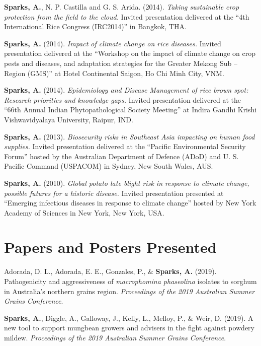 \documentclass[11pt, a4paper]{awesome-cv}
\begin{document}
\textbf{Sparks, A.}, N. P. Castilla and G. S. Arida. (2014).
\emph{Taking sustainable crop protection from the field to the cloud.}
Invited presentation delivered at the ``4th International Rice Congress
(IRC2014)'' in Bangkok, THA.

\textbf{Sparks, A.} (2014). \emph{Impact of climate change on rice
diseases.} Invited presentation delivered at the ``Workshop on the
impact of climate change on crop pests and diseases, and adaptation
strategies for the Greater Mekong Sub -- Region (GMS)'' at Hotel
Continental Saigon, Ho Chi Minh City, VNM.

\textbf{Sparks, A.} (2014). \emph{Epidemiology and Disease Management of
rice brown spot: Research priorities and knowledge gaps.} Invited
presentation delivered at the ``66th Annual Indian Phytopathological
Society Meeting'' at Indira Gandhi Krishi Vishwavidyalaya University,
Raipur, IND.

\textbf{Sparks, A.} (2013). \emph{Biosecurity risks in Southeast Asia
impacting on human food supplies.} Invited presentation delivered at the
``Pacific Environmental Security Forum'' hosted by the Australian
Department of Defence (ADoD) and U. S. Pacific Command (USPACOM) in
Sydney, New South Wales, AUS.

\textbf{Sparks, A.} (2010). \emph{Global potato late blight risk in
response to climate change, possible futures for a historic disease.}
Invited presentation presented at ``Emerging infectious diseases in
response to climate change'' hosted by New York Academy of Sciences in
New York, New York, USA.

\endgroup

\hypertarget{papers-and-posters-presented}{%
\section{Papers and Posters
Presented}\label{papers-and-posters-presented}}

\begingroup
\setlength{\parindent}{-0.5in}
\setlength{\leftskip}{0.5in}

\hypertarget{refs_proceedings}{}
\leavevmode{}%
Adorada, D. L., Adorada, E. E., Gonzales, P., \& \textbf{Sparks, A.}
(2019). Pathogenicity and aggressiveness of \emph{macrophomina
phaseolina} isolates to sorghum in {Australia's} northern grains region.
\emph{Proceedings of the 2019 Australian Summer Grains Conference}.

\leavevmode{}%
\textbf{Sparks, A.}, Diggle, A., Galloway, J., Kelly, L., Melloy, P., \&
Weir, D. (2019). A new tool to support mungbean growers and advisers in
the fight against powdery mildew. \emph{Proceedings of the 2019
Australian Summer Grains Conference}.
\end{document}
